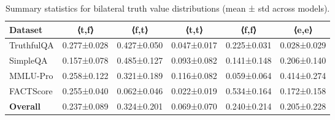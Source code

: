 
\begin{table}[htbp]
\centering
\caption{Summary statistics for bilateral truth value distributions (mean ± std across models).}
\begin{tabular}{l|cccc|c}
\toprule
\textbf{Dataset} & ⟨t,f⟩ & ⟨f,t⟩ & ⟨t,t⟩ & ⟨f,f⟩ & ⟨e,e⟩ \\
\midrule
TruthfulQA & 0.277±0.028 & 0.427±0.050 & 0.047±0.017 & 0.225±0.031 & 0.028±0.029 \\
SimpleQA & 0.157±0.078 & 0.485±0.127 & 0.093±0.082 & 0.141±0.148 & 0.206±0.140 \\
MMLU-Pro & 0.258±0.122 & 0.321±0.189 & 0.116±0.082 & 0.059±0.064 & 0.414±0.274 \\
FACTScore & 0.255±0.040 & 0.062±0.046 & 0.022±0.019 & 0.534±0.164 & 0.172±0.158 \\
\midrule
\textbf{Overall} & 0.237±0.089 & 0.324±0.201 & 0.069±0.070 & 0.240±0.214 & 0.205±0.228 \\
\bottomrule
\end{tabular}
\end{table}

